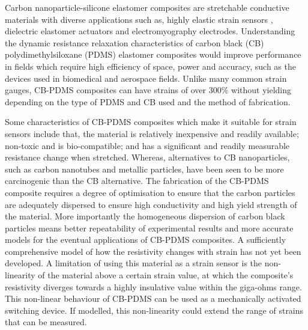 Carbon nanoparticle-silicone elastomer composites are stretchable conductive materials with diverse applications such as, highly elastic strain sensors \cite{Lacasse2010,Spahr2017,Kim2018}, dielectric elastomer actuators \cite{Henke2018,Liu2009} and electromyography electrodes\cite{Carpi2010,Kim2018,Mouri2019}. Understanding the dynamic resistance relaxation characteristics of carbon black (CB) polydimethylsiloxane (PDMS) elastomer composites would improve performance in fields which require high efficiency of space, power and accuracy, such as the devices used in biomedical and aerospace fields. Unlike many common strain gauges, CB-PDMS composites can have strains of over 300\% without yielding\cite{Wang2010} depending on the type of PDMS and CB used and the method of fabrication. 


Some characteristics of CB-PDMS composites which make it suitable for strain sensors include that, the material is relatively inexpensive and readily available; non-toxic and is bio-compatible; and has a significant and readily measurable resistance change when stretched. Whereas, alternatives to CB nanoparticles, such as carbon nanotubes\cite{Maddipatla2017,Wang2013} and metallic particles\cite{Quinsaat2015,Racles2021}, have been seen to be more carcinogenic than the CB alternative\cite{Fukushima2018,Ferdous2020,Rausch2004}. The fabrication of the CB-PDMS composite requires a degree of optimisation to ensure that the carbon particles are adequately dispersed to ensure high conductivity and high yield strength of the material. More importantly the homogeneous dispersion of carbon black particles means better repeatability of experimental results and more accurate models for the eventual applications of CB-PDMS composites. A sufficiently comprehensive model of how the resistivity changes with strain has not yet been developed. A limitation of using this material as a strain sensor is the non-linearity of the material above a certain strain value, at which the composite's resistivity diverges towards a highly insulative value within the giga-ohms range. This non-linear behaviour of CB-PDMS can be used as a mechanically activated switching device\cite{Henke2018}. If modelled, this non-linearity could extend the range of strains that can be measured.

